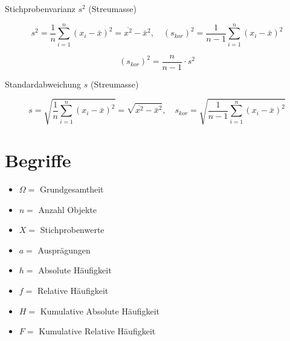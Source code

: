 \documentclass[10pt]{article}
\begin{document}
Stichprobenvarianz $s^{2}$ (Streumasse)

$$
s^{2}=\frac{1}{n} \sum_{i=1}^{n}\left(x_{i}-\bar{x}\right)^{2}=\overline{x^{2}}-\bar{x}^{2}, \quad\left(s_{k o r}\right)^{2}=\frac{1}{n-1} \sum_{i=1}^{n}\left(x_{i}-\bar{x}\right)^{2}
$$

$$
\left(s_{k o r}\right)^{2}=\frac{n}{n-1} \cdot s^{2}
$$

Standardabweichung $s$ (Streumasse)

$$
s=\sqrt{\frac{1}{n} \sum_{i=1}^{n}\left(x_{i}-\bar{x}\right)^{2}}=\sqrt{\overline{x^{2}}-\bar{x}^{2}}, \quad s_{k o r}=\sqrt{\frac{1}{n-1} \sum_{i=1}^{n}\left(x_{i}-\bar{x}\right)^{2}}
$$

\section*{Begriffe}
\begin{itemize}
  \item $\Omega=$ Grundgesamtheit
  \item $n=$ Anzahl Objekte
  \item $X=$ Stichprobenwerte
  \item $a=$ Ausprägungen
  \item $h=$ Absolute Häufigkeit
  \item $f=$ Relative Häufigkeit
  \item $H=$ Kumulative Absolute Häufigkeit
  \item $F=$ Kumulative Relative Häufigkeit
\end{itemize}
\end{document}
